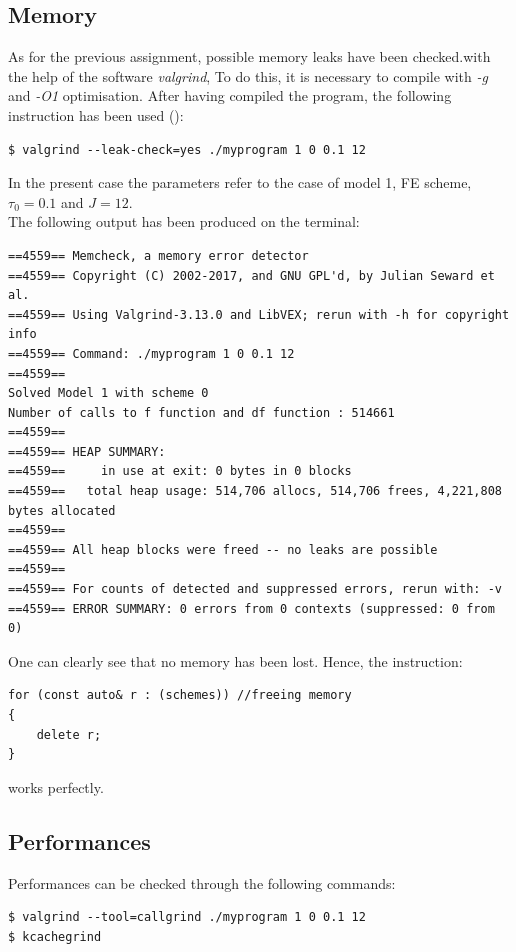 \documentclass[11pt]{article}
\theoremstyle{theorem}
\theoremstyle{definition}
\begin{document}
\subsection{Memory}
As for the previous assignment, possible memory leaks have been checked.with the help of the software \emph{valgrind}, To do this, it is necessary to compile with \emph{-g} and \emph{-O1} optimisation. After having compiled the program, the following instruction has been used ():


\begin{lstlisting}
$ valgrind --leak-check=yes ./myprogram 1 0 0.1 12
\end{lstlisting}

In the present case the parameters refer to the case of model 1, FE scheme, $\tau_0=0.1$ and $J=12$.\\

The following output has been produced on the terminal:

\begin{verbatim}
==4559== Memcheck, a memory error detector
==4559== Copyright (C) 2002-2017, and GNU GPL'd, by Julian Seward et al.
==4559== Using Valgrind-3.13.0 and LibVEX; rerun with -h for copyright info
==4559== Command: ./myprogram 1 0 0.1 12
==4559== 
Solved Model 1 with scheme 0
Number of calls to f function and df function : 514661
==4559== 
==4559== HEAP SUMMARY:
==4559==     in use at exit: 0 bytes in 0 blocks
==4559==   total heap usage: 514,706 allocs, 514,706 frees, 4,221,808 bytes allocated
==4559== 
==4559== All heap blocks were freed -- no leaks are possible
==4559== 
==4559== For counts of detected and suppressed errors, rerun with: -v
==4559== ERROR SUMMARY: 0 errors from 0 contexts (suppressed: 0 from 0)
\end{verbatim}

One can clearly see that no memory has been lost. Hence, the instruction:

\begin{lstlisting}
for (const auto& r : (schemes)) //freeing memory
{
	delete r;
}
\end{lstlisting}

works perfectly.\\

\subsection{Performances}
\label{subsec:perf}
Performances can be checked through the following commands:
\begin{verbatim}
$ valgrind --tool=callgrind ./myprogram 1 0 0.1 12
$ kcachegrind
\end{verbatim}
\end{document}
